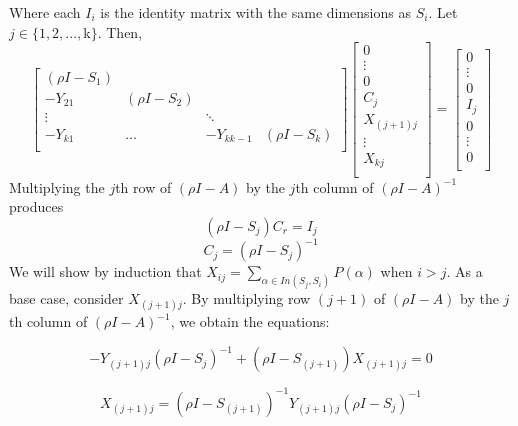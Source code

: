 \documentclass{paper}
\begin{document}
Where each $I_i$ is the identity matrix with the same dimensions as $S_i$. Let $j \in  \{1,2,...,$k$\}$. Then,
\[
\begin{bmatrix}
(\rho I - S_1) \\
-Y_{21} & (\rho I - S_2) \\
\vdots & & \ddots \\
-Y_{k1} & \hdots & -Y_{kk-1} & (\rho I - S_k) \\
\end{bmatrix}
\begin{bmatrix}
0 \\
\vdots \\
0 \\
C_j \\
X_{(j+1)j} \\
\vdots \\
X_{kj} \\
\end{bmatrix}
= 
\begin{bmatrix}
0\\
\vdots \\
0 \\
I_j\\
0\\
\vdots\\
0\\
\end{bmatrix}
\]
Multiplying the $j$th row of $(\rho I -A)$ by the $j$th column of $(\rho I -A)^{-1}$ produces
\[
(\rho I - S_j)C_r = I_j
\]
\begin{equation}
C_j = (\rho I - S_j)^{-1}
\end{equation}
We will show by induction that $X_{ij} = \sum_{\alpha \in In(S_j,S_i)} P(\alpha)$ when $i > j$. As a base case, consider $X_{(j+1)j}$. By multiplying row $(j+1)$ of $(\rho I-A)$ by the $j$th column of $(\rho I - A)^{-1}$, we obtain the equations:

\[
-Y_{(j+1)j}(\rho I - S_{j})^{-1} + (\rho I -S_{(j+1)})X_{(j+1)j} = 0
\]

\begin{equation}
X_{(j+1)j} = (\rho I - S_{(j+1)})^{-1}Y_{(j+1)j}(\rho I - S_j)^{-1}
\end{equation}
\end{document}
